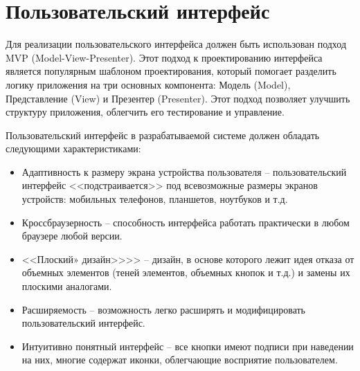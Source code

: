 \section*{Пользовательский интерфейс}

Для реализации пользовательского интерфейса должен быть использован подход MVP (Model-View-Presenter). Этот подход к проектированию интерфейса является популярным шаблоном проектирования, который помогает разделить логику приложения на три основных компонента: Модель (Model), Представление (View) и Презентер (Presenter). Этот подход позволяет улучшить структуру приложения, облегчить его тестирование и управление.

Пользовательский интерфейс в разрабатываемой системе должен обладать следующими характеристиками:
\begin{itemize}
    \item Адаптивность к размеру экрана устройства пользователя -- пользовательский интерфейс <<подстраивается>> под всевозможные размеры экранов устройств: мобильных телефонов, планшетов, ноутбуков и т.д.
    \item Кроссбраузерность -- способность интерфейса работать практически в любом браузере любой версии. 
    \item <<Плоский» дизайн>>>> -- дизайн, в основе которого лежит идея отказа от объемных элементов (теней элементов, объемных кнопок и т.д.) и замены их плоскими аналогами.
    \item Расширяемость -- возможность легко расширять и модифицировать пользовательский интерфейс.
    \item Интуитивно понятный интерфейс -- все кнопки имеют подписи при наведении на них, многие содержат иконки, облегчающие восприятие пользователем.
\end{itemize}